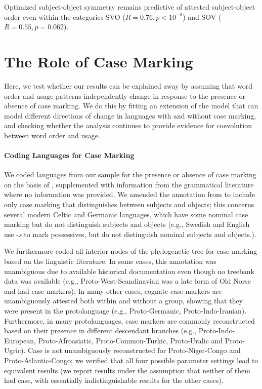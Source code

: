 \documentclass[11pt,a4paper]{article}
\begin{document}
Optimized subject-object symmetry remains predictive of attested subject-object order even within the categories SVO ($R = 0.76, p < 10^{-8}$) and SOV ($R=0.55, p = 0.062$).




\section{The Role of Case Marking}

Here, we test whether our results can be explained away by assuming that word order and usage patterns independently change in response to the presence or absence of case marking.
We do this by fitting an extension of the model that can model different directions of change in languages with and without case marking, and checking whether the analysis continues to provide evidence for coevolution between word order and usage.

\paragraph{Coding Languages for Case Marking}
We coded languages from our sample for the presence or absence of case marking on the basis of \citep{wals-49}, supplemented with information from the grammatical literature where no information was provided.
We amended the annotation from \citep{wals-49} to include only case marking that distinguishes between subjects and objects; this concerns several modern Celtic and Germanic languages, which have some nominal case marking but do not distinguish subjects and objects (e.g., Swedish and English use -\textit{s} to mark possessives, but do not distinguish nominal subjects and objects.).

We furthermore coded all interior nodes of the phylogenetic tree for case marking based on the linguistic literature.
In some cases, this annotation was unambiguous due to available historical documentation even though no treebank data was available (e.g., Proto-West-Scandinavian was a late form of Old Norse and had case markers).
In many other cases, cognate case markers are unambiguously attested both within and without a group, showing that they were present in the protolanguage (e.g., Proto-Germanic, Proto-Indo-Iranian).
Furthermore, in many protolanguages, case markers are commonly reconstructed based on their presence in different descendant branches (e.g., Proto-Indo-European, Proto-Afroasiatic, Proto-Common-Turkic, Proto-Uralic and Proto-Ugric). %
Case is not unambiguously reconstructed for Proto-Niger-Congo and Proto-Atlantic-Congo; we verified that all four possible parameter settings lead to equivalent results (we report results under the assumption that neither of them had case, with essentially indistinguishable results for the other cases).
\end{document}
